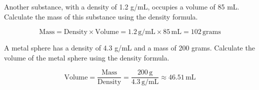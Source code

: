 \documentclass[10pt]{exam}
\begin{document}
\begin{questions}
  \question
  Another substance, with a density of 1.2 g/mL, occupies a volume of 85 mL. Calculate the mass of this substance using the density formula.

  \ku
  
  \begin{solution}
  \[
  \text{Mass} = \text{Density} \times \text{Volume} = 1.2 \, \text{g/mL} \times 85 \, \text{mL} = 102 \, \text{grams}
  \]
  \end{solution}
  
  \question
  A metal sphere has a density of 4.3 g/mL and a mass of 200 grams. Calculate the volume of the metal sphere using the density formula.

  \ku
  
  \begin{solution}
  \[
  \text{Volume} = \frac{\text{Mass}}{\text{Density}} = \frac{200 \, \text{g}}{4.3 \, \text{g/mL}} \approx 46.51 \, \text{mL}
  \]
  \end{solution}
  
  \end{questions}
\end{document}
